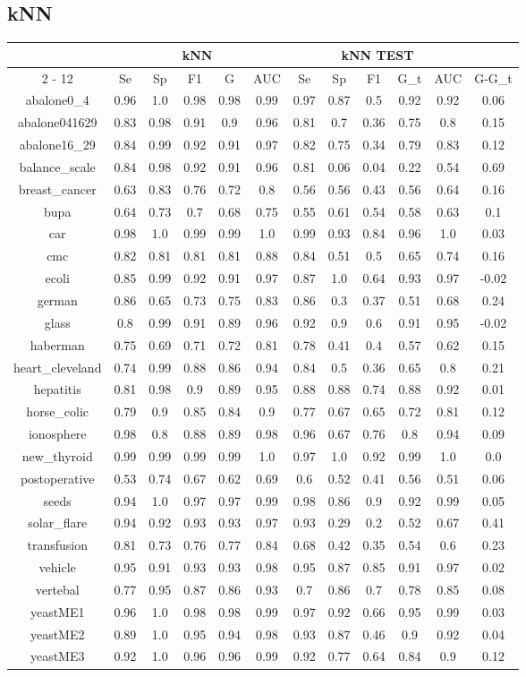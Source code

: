\documentclass{article}%
\begin{document}
%
\subsection*{kNN}%
\begin{tabular}{|c|c|c|c|c|c|c|c|c|c|c|c|}%
\hline%
&\multicolumn{5}{|c|}{kNN}&\multicolumn{5}{|c|}{kNN TEST}&\\%
\cline{2%
-%
12}%
&Se&Sp&F1&G&AUC&Se&Sp&F1&G\_t&AUC&G{-}G\_t\\%
\hline%
abalone0\_4&0.96&1.0&0.98&0.98&0.99&0.97&0.87&0.5&0.92&0.92&0.06\\%
abalone041629&0.83&0.98&0.91&0.9&0.96&0.81&0.7&0.36&0.75&0.8&0.15\\%
abalone16\_29&0.84&0.99&0.92&0.91&0.97&0.82&0.75&0.34&0.79&0.83&0.12\\%
balance\_scale&0.84&0.98&0.92&0.91&0.96&0.81&0.06&0.04&0.22&0.54&0.69\\%
breast\_cancer&0.63&0.83&0.76&0.72&0.8&0.56&0.56&0.43&0.56&0.64&0.16\\%
bupa&0.64&0.73&0.7&0.68&0.75&0.55&0.61&0.54&0.58&0.63&0.1\\%
car&0.98&1.0&0.99&0.99&1.0&0.99&0.93&0.84&0.96&1.0&0.03\\%
cmc&0.82&0.81&0.81&0.81&0.88&0.84&0.51&0.5&0.65&0.74&0.16\\%
ecoli&0.85&0.99&0.92&0.91&0.97&0.87&1.0&0.64&0.93&0.97&{-}0.02\\%
german&0.86&0.65&0.73&0.75&0.83&0.86&0.3&0.37&0.51&0.68&0.24\\%
glass&0.8&0.99&0.91&0.89&0.96&0.92&0.9&0.6&0.91&0.95&{-}0.02\\%
haberman&0.75&0.69&0.71&0.72&0.81&0.78&0.41&0.4&0.57&0.62&0.15\\%
heart\_cleveland&0.74&0.99&0.88&0.86&0.94&0.84&0.5&0.36&0.65&0.8&0.21\\%
hepatitis&0.81&0.98&0.9&0.89&0.95&0.88&0.88&0.74&0.88&0.92&0.01\\%
horse\_colic&0.79&0.9&0.85&0.84&0.9&0.77&0.67&0.65&0.72&0.81&0.12\\%
ionosphere&0.98&0.8&0.88&0.89&0.98&0.96&0.67&0.76&0.8&0.94&0.09\\%
new\_thyroid&0.99&0.99&0.99&0.99&1.0&0.97&1.0&0.92&0.99&1.0&0.0\\%
postoperative&0.53&0.74&0.67&0.62&0.69&0.6&0.52&0.41&0.56&0.51&0.06\\%
seeds&0.94&1.0&0.97&0.97&0.99&0.98&0.86&0.9&0.92&0.99&0.05\\%
solar\_flare&0.94&0.92&0.93&0.93&0.97&0.93&0.29&0.2&0.52&0.67&0.41\\%
transfusion&0.81&0.73&0.76&0.77&0.84&0.68&0.42&0.35&0.54&0.6&0.23\\%
vehicle&0.95&0.91&0.93&0.93&0.98&0.95&0.87&0.85&0.91&0.97&0.02\\%
vertebal&0.77&0.95&0.87&0.86&0.93&0.7&0.86&0.7&0.78&0.85&0.08\\%
yeastME1&0.96&1.0&0.98&0.98&0.99&0.97&0.92&0.66&0.95&0.99&0.03\\%
yeastME2&0.89&1.0&0.95&0.94&0.98&0.93&0.87&0.46&0.9&0.92&0.04\\%
yeastME3&0.92&1.0&0.96&0.96&0.99&0.92&0.77&0.64&0.84&0.9&0.12\\%
\hline%
\end{tabular}
\end{document}
